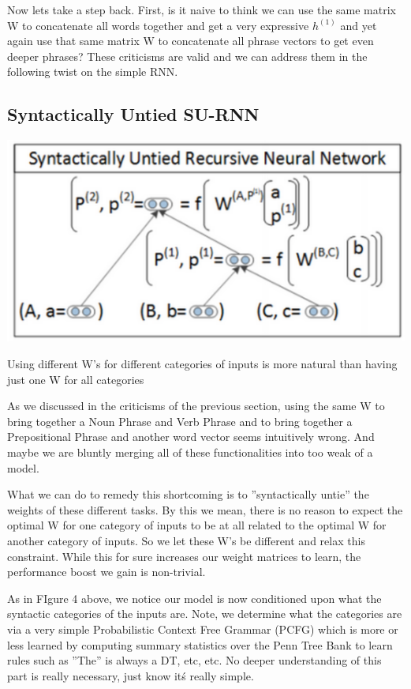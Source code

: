 \documentclass{tufte-handout}
\begin{document}
Now lets take a step back. First, is it naive to think we can use the same matrix W to concatenate all words together and get a very expressive $h^{(1)}$ and yet again use that same matrix W to concatenate all phrase vectors to get even deeper phrases? These criticisms are valid and we can address them in the following twist on the simple RNN.

\subsection{Syntactically Untied SU-RNN}


\begin{marginfigure}%
  \includegraphics[width=\linewidth]{img4}
  \caption{Using different W's for different categories of inputs is more natural than having just one W for all categories }
  \label{fig:img4}
\end{marginfigure}

As we discussed in the criticisms of the previous section, using the same W to bring together a Noun Phrase and Verb Phrase and to bring together a Prepositional Phrase and another word vector seems intuitively wrong. And maybe we are bluntly merging all of these functionalities into too weak of a model.

What we can do to remedy this shortcoming is to ''syntactically untie'' the weights of these different tasks. By this we mean, there is no reason to expect the optimal W for one category of inputs to be at all related to the optimal W for another category of inputs. So we let these W's be different and relax this constraint. While this for sure increases our weight matrices to learn, the performance boost we gain is non-trivial.

As in FIgure 4 above, we notice our model is now conditioned upon what the syntactic categories of the inputs are. Note, we determine what the categories are via a very simple Probabilistic Context Free Grammar (PCFG) which is more or less learned by computing summary statistics over the Penn Tree Bank to learn rules such as ''The'' is always a DT, etc, etc. No deeper understanding of this part is really necessary, just know it\'s really simple.
\end{document}
